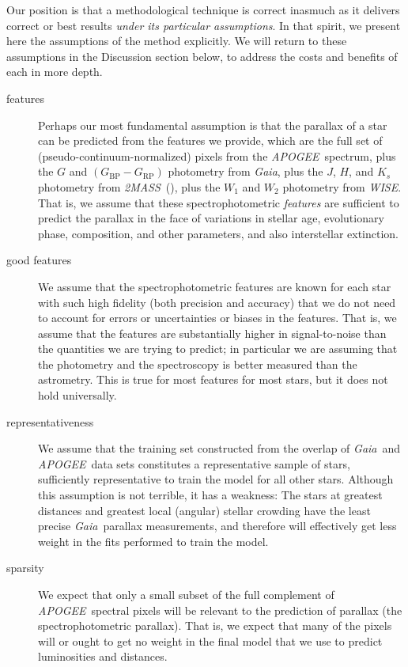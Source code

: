 \documentclass[modern]{aastex62}
\newcommand{\acronym}[1]{{\small{#1}}}
\newcommand{\project}[1]{\textsl{#1}}
\newcommand{\apogee}{\project{\acronym{APOGEE}}}
\newcommand{\gaia}{\project{Gaia}}
\newcommand{\wise}{\project{\acronym{WISE}}}
\newcommand{\zmass}{\project{\acronym{2MASS}}}
\newcommand{\BP}{{G_\mathrm{BP}}}
\newcommand{\RP}{{G_\mathrm{RP}}}
\begin{document}
Our position is that a methodological technique is correct inasmuch as
it delivers correct or best results \emph{under its particular assumptions}.
In that spirit, we present here the assumptions of the method
explicitly.
We will return to these assumptions in the Discussion section below,
to address the costs and benefits of each in more depth.
\begin{description}
\item[features] Perhaps our most fundamental assumption is that the parallax
of a star can be predicted from the features we provide, which are
the full set of (pseudo-continuum-normalized) pixels from the \apogee\ spectrum,
plus the $G$ and $(\BP-\RP)$ photometry from \gaia,
plus the $J$, $H$, and $K_s$ photometry from \zmass\ (\citealt{zmass}),
plus the $W_1$ and $W_2$ photometry from \wise.
That is, we assume that these spectrophotometric \emph{features} are sufficient
to predict the parallax in the face of variations in stellar
age, evolutionary phase, composition, and other parameters, and also interstellar
extinction.

\item[good features] We assume that the spectrophotometric features are known for
each star with such high fidelity (both precision and accuracy) that we do not
need to account for errors or uncertainties or biases in the features.
That is, we assume that the features are substantially higher in signal-to-noise than the
quantities we are trying to predict; in particular we are assuming that the photometry
and the spectroscopy is better measured than the astrometry.
This is true for most features for most stars, but it does not hold universally.

\item[representativeness] We assume that the training set constructed from the overlap
of \gaia\ and \apogee\ data sets constitutes a representative sample of stars,
sufficiently representative to train the model for all other stars.
Although this assumption is not terrible, it has a weakness:
The stars at greatest distances and greatest local (angular) stellar crowding have
the least precise \gaia\ parallax measurements, and therefore will effectively get
less weight in the fits performed to train the model.

\item[sparsity] We expect that only a small subset of the full complement of
\apogee\ spectral pixels will be relevant to the prediction of parallax
(the spectrophotometric parallax).
That is, we expect that many of the pixels will or ought to get no weight in the
final model that we use to predict luminosities and distances.


\end{description}
\end{document}
